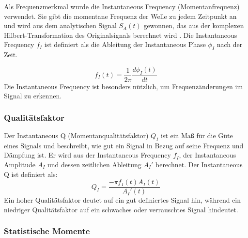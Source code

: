 Als Frequenzmerkmal wurde die Instantaneous Frequency (Momentanfrequenz) \parencite{taner_complex_1979} verwendet. Sie gibt die momentane Frequenz der Welle zu jedem Zeitpunkt an und wird aus dem analytischen Signal $S_A(t)$ gewonnen, das aus der komplexen Hilbert-Transformation des Originalsignals berechnet wird \parencite[S. 177]{sheriff_encyclopedic_2002}. Die Instantaneous Frequency $f_I$ ist definiert als die Ableitung der Instantaneous Phase $\phi_I$ nach der Zeit.

\begin{equation}
    f_I(t) = \frac{1}{2\pi} \frac{d\phi_I(t)}{dt}
\end{equation}
Die Instantaneous Frequency ist besonders nützlich, um Frequenzänderungen im Signal zu erkennen.


\subsubsection{Qualitätsfaktor}

Der Instantaneous Q (Momentanqualitätsfaktor) $Q_I$ \parencite{seg_wiki_instantaneous_2024} ist ein Maß für die Güte eines Signals und beschreibt, wie gut ein Signal in Bezug auf seine Frequenz und Dämpfung ist. Er wird aus der Instantaneous Frequency $f_I$, der Instantaneous Amplitude $A_I$ und dessen zeitlichen Ableitung $A_I'$ berechnet. Der Instantaneous Q ist definiert als: \\

\begin{equation}
    Q_I = \frac{-\pi f_I(t) A_I(t)}{A_I'(t)}
\end{equation}
Ein hoher Qualitätsfaktor deutet auf ein gut definiertes Signal hin, während ein niedriger Qualitätsfaktor auf ein schwaches oder verrauschtes Signal hindeutet.


\subsubsection{Statistische Momente}

